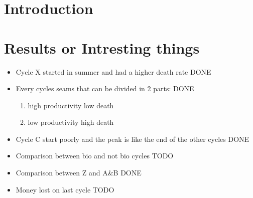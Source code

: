 \documentclass[11pt]{article}
\begin{document}
\section{Introduction}

\section{Results or Intresting things}
\begin{itemize}
    \item Cycle X started in summer and had a higher death rate DONE
    \item Every cycles seams that can be divided in 2 parts: DONE
    \begin{enumerate}
        \item high productivity low death 
        \item low productivity high death
    \end{enumerate}
    \item Cycle C start poorly and the peak is like the end of the other cycles DONE
    \item Comparison between bio and not bio cycles TODO
    \item Comparison between Z and A&B DONE
    \item Money lost on last cycle TODO
\end{itemize}
\end{document}
